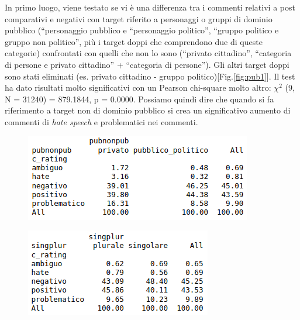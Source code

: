 In  primo luogo, viene testato se vi è una differenza tra i commenti relativi a post comparativi e negativi con target riferito  a personaggi o gruppi di dominio pubblico (“personaggio pubblico e “personaggio politico”, “gruppo politico e gruppo non politico”, più i target doppi che comprendono due di queste categorie) confrontati con quelli che non lo sono (“privato cittadino”, “categoria di persone e privato cittadino” + “categoria di persone”). Gli altri target doppi sono stati eliminati (es. privato cittadino - gruppo politico)[Fig.\ref{fig:pub1}]. Il test ha dato risultati molto significativi con un Pearson chi-square molto altro: $\chi^{2}$ (9, N = 31240) = 879.1844, p = 0.0000. Possiamo quindi dire che quando si fa riferimento a target non di dominio pubblico si crea un significativo aumento di commenti di \textit{hate speech} e problematici nei commenti.
\begin{figure}
	\begin{minipage}{.5\textwidth}
		\includegraphics[width=\linewidth]{figures/pub1}
		\label{fig:pub1}
	\end{minipage}
	\begin{minipage}{.5\textwidth}
		\includegraphics[width=0.85\linewidth]{figures/sing1}
		\label{fig:sing1}
	\end{minipage}
\end{figure}

